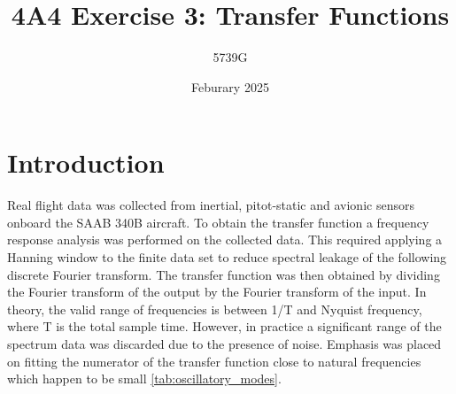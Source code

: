 \documentclass{article}
\begin{document}
\title{4A4 Exercise 3: Transfer Functions}
\author{5739G}
\date{Feburary 2025}
\maketitle

\section{Introduction}

Real flight data was collected from inertial, pitot-static and avionic sensors onboard the SAAB 340B aircraft.
To obtain the transfer function a frequency response analysis was performed on the collected data.
This required applying a Hanning window to the finite data set to reduce spectral leakage of the following discrete Fourier transform.
The transfer function was then obtained by dividing the Fourier transform of the output by the Fourier transform of the input.
In theory, the valid range of frequencies is between 1/T and Nyquist frequency, where T is the total sample time.
However, in practice a significant range of the spectrum data was discarded due to the presence of noise.
Emphasis was placed on fitting the numerator of the transfer function close to natural frequencies which happen to be small \ref{tab:oscillatory_modes}.
\end{document}
